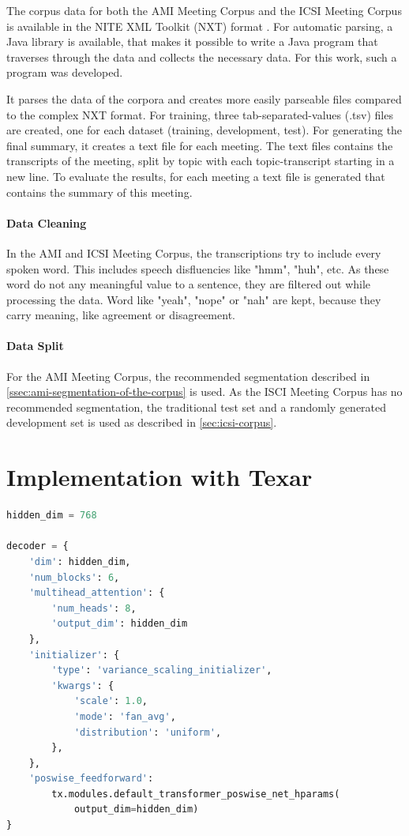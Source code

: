 The corpus data for both the AMI Meeting Corpus and the ICSI Meeting Corpus is available in the NITE XML Toolkit (NXT) format \cite{Carletta2003}.
For automatic parsing, a Java library is available, that makes it possible to write a Java program that traverses through the data and collects the necessary data.
For this work, such a program was developed.

It parses the data of the corpora and creates more easily parseable files compared to the complex NXT format.
For training, three tab-separated-values (.tsv) files are created, one for each dataset (training, development, test).
For generating the final summary, it creates a text file for each meeting.
The text files contains the transcripts of the meeting, split by topic with each topic-transcript starting in a new line.
To evaluate the results, for each meeting a text file is generated that contains the summary of this meeting.

\paragraph{Data Cleaning}

In the AMI and ICSI Meeting Corpus, the transcriptions try to include every spoken word.
This includes speech disfluencies like "hmm", "huh", etc.
As these word do not any meaningful value to a sentence, they are filtered out while processing the data.
Word like "yeah", "nope" or "nah" are kept, because they carry meaning, like agreement or disagreement. 

\paragraph{Data Split}

For the AMI Meeting Corpus, the recommended segmentation described in \cref{ssec:ami-segmentation-of-the-corpus} is used.
As the ISCI Meeting Corpus has no recommended segmentation, the traditional test set and a randomly generated development set is used as described in \cref{sec:icsi-corpus}.


\section{Implementation with Texar}

\begin{lstlisting}[numbers=none,language=Python,caption={Hyperparameters for Transformer decoder},captionpos=b,label=lst:hyperparameters-decoder]
hidden_dim = 768

decoder = {
    'dim': hidden_dim,
    'num_blocks': 6,
    'multihead_attention': {
        'num_heads': 8,
        'output_dim': hidden_dim
    },
    'initializer': {
        'type': 'variance_scaling_initializer',
        'kwargs': {
            'scale': 1.0,
            'mode': 'fan_avg',
            'distribution': 'uniform',
        },
    },
    'poswise_feedforward': 
        tx.modules.default_transformer_poswise_net_hparams(
            output_dim=hidden_dim)
}
\end{lstlisting}

